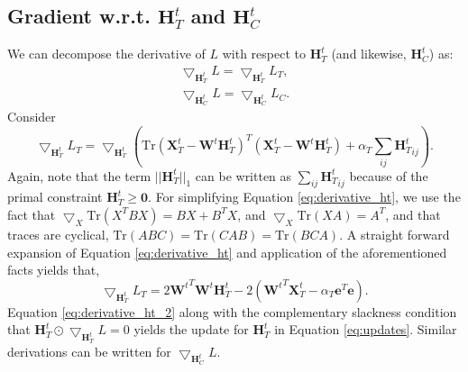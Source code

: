 \documentclass[a4paper,10pt]{article}
\newcommand{\W}{\textbf{W}^t}
\newcommand{\HT}{\textbf{H}^t_T}
\newcommand{\HC}{\textbf{H}^t_C}
\newcommand{\XT}{\textbf{X}^t_T}
\newcommand{\0}{\textbf{0}}
\newcommand{\e}{\textbf{e}}
\begin{document}
\subsection{Gradient w.r.t. $\HT$ and $\HC$}
We can decompose the derivative of $L$ with respect to $\HT$ (and likewise, $\HC$) as:
\begin{eqnarray}
\bigtriangledown_{\HT}L = \bigtriangledown_{\HT}L_T, \\
\bigtriangledown_{\HC}L = \bigtriangledown_{\HC}L_C.
\end{eqnarray}
Consider
\begin{equation}
\bigtriangledown_{\HT}L_T =\bigtriangledown_{\HT}\left( \text{Tr}(\XT - \W\HT)^T(\XT - \W\HT) + \alpha_T\sum_{ij}{\HT}_{ij}\right).
\label{eq:derivative_ht}
\end{equation}
Again, note that the term $||\HT||_1$ can be written as $\sum_{ij}{\HT}_{ij}$ because of the primal constraint $\HT \geq \0$. 
For simplifying Equation \ref{eq:derivative_ht}, we use the fact that $\bigtriangledown_{X}\text{Tr}(X^{T}BX) = BX+B^TX$, and
$\bigtriangledown_{X}\text{Tr}(XA) = A^T$, and that traces are cyclical, $\text{Tr}(ABC) = \text{Tr}(CAB) = \text{Tr}(BCA)$.
A straight forward expansion of Equation \ref{eq:derivative_ht} and application of the aforementioned facts yields that,
\begin{equation}
\bigtriangledown_{\HT}L_T = 2 {\W}^T\W\HT - 2({\W}^T\XT - \alpha_T\e^T\e). \label{eq:derivative_ht_2}
\end{equation}
Equation \ref{eq:derivative_ht_2} along with the complementary slackness condition that $\HT \odot \bigtriangledown_{\HT}L = 0$ yields
the update for $\HT$ in Equation \ref{eq:updates}.  Similar derivations can be written for $\bigtriangledown_{\HC}L$.
\end{document}
